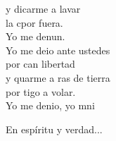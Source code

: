 \begin{cancion}
	y dicarme a lavar \\
	la cpor fuera. \\
	Yo me denun. \\
	\jump
	Yo me deio ante ustedes \\
	por can libertad \\
	y quarme a ras de tierra \\
	por tigo a volar. \\
	Yo me denio, yo mni\jump\\
	\begin{chorus}%
	En espíritu y verdad...\jump\\
	\end{chorus}%
\end{cancion}%
